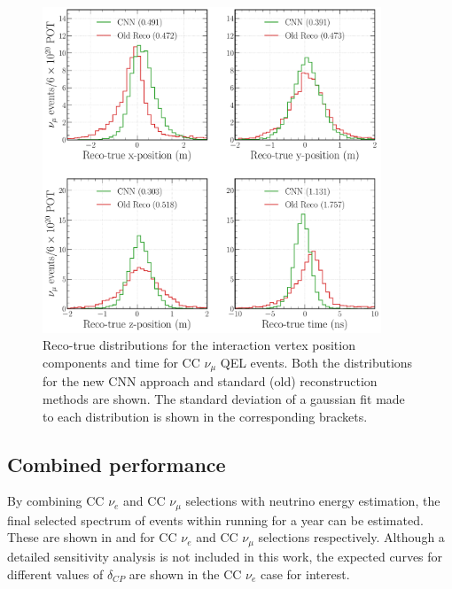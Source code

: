 \begin{figure} %
    \includegraphics[width=0.9\textwidth]{diagrams/7-results/final_vertex_numu_res_comparison.pdf}
    \caption[Reco-true distributions for the interaction vertex parameters for CC $\nu_{\mu}$ QEL
        events] {Reco-true distributions for the interaction vertex position components and time
        for CC $\nu_{\mu}$ QEL events. Both the distributions for the new CNN approach and
        standard (old) reconstruction methods are shown. The standard deviation of a gaussian fit
        made to each distribution is shown in the corresponding brackets.}
    \label{fig:final_vertex_numu_res_comparison}
\end{figure}

\subsection{Combined performance} %
\label{sec:results_eval_combined} %

By combining CC $\nu_{e}$ and CC $\nu_{\mu}$ selections with neutrino energy estimation, the final
selected spectrum of events within \chipsfive running for a year can be estimated. These are shown
in  and 
for CC $\nu_{e}$ and CC $\nu_{\mu}$ selections respectively. Although a detailed \chipsfive
sensitivity analysis is not included in this work, the expected curves for different values of
$\delta_{CP}$ are shown in the CC $\nu_{e}$ case for interest.

